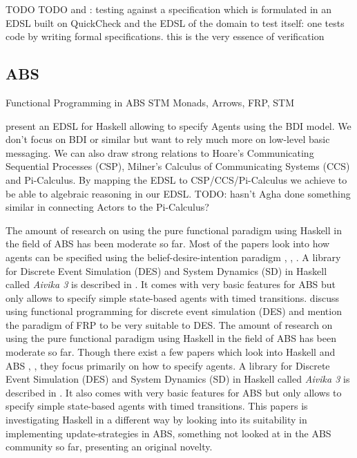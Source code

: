 TODO \cite{hutton_programming_2007}
TODO \cite{claessen_quickcheck:_2000} and \cite{claessen_testing_2002}: testing against a specification which is formulated in an EDSL built on QuickCheck and the EDSL of the domain to test itself: one tests code by writing formal specifications. this is the very essence of verification


\subsection{ABS}
Functional Programming in ABS
STM Monads, Arrows, FRP, STM
\cite{Bezirgiannis2013}

\cite{sulzmann_specifying_2007} present an EDSL for Haskell allowing to specify Agents using the BDI model. We don't focus on BDI or similar but want to rely much more on low-level basic messaging. We can also draw strong relations to Hoare's Communicating Sequential Processes (CSP), Milner's Calculus of Communicating Systems (CCS) and Pi-Calculus. By mapping the EDSL to CSP/CCS/Pi-Calculus we achieve to be able to algebraic reasoning in our EDSL. TODO: hasn't Agha done something similar in connecting Actors to the Pi-Calculus?

The amount of research on using the pure functional paradigm using Haskell in the field of ABS has been moderate so far. Most of the papers look into how agents can be specified using the belief-desire-intention paradigm \cite{de_jong_suitability_2014}, \cite{sulzmann_specifying_2007}, \cite{jankovic_functional_2007}.
A library for Discrete Event Simulation (DES) and System Dynamics (SD) in Haskell called \textit{Aivika 3} is described in \cite{sorokin_aivika_2015}. It comes with very basic features for ABS but only allows to specify simple state-based agents with timed transitions.
\cite{jankovic_functional_2007} discuss using functional programming for discrete event simulation (DES) and mention the paradigm of FRP to be very suitable to DES.
The amount of research on using the pure functional paradigm using Haskell in the field of ABS has been moderate so far. Though there exist a few papers which look into Haskell and ABS \cite{de_jong_suitability_2014}, \cite{sulzmann_specifying_2007}, \cite{jankovic_functional_2007} they focus primarily on how to specify agents. A library for Discrete Event Simulation (DES) and System Dynamics (SD) in Haskell called \textit{Aivika 3} is described in \cite{sorokin_aivika_2015}. It also comes with very basic features for ABS but only allows to specify simple state-based agents with timed transitions. This papers is investigating Haskell in a different way by looking into its suitability in implementing update-strategies in ABS, something not looked at in the ABS community so far, presenting an original novelty.

